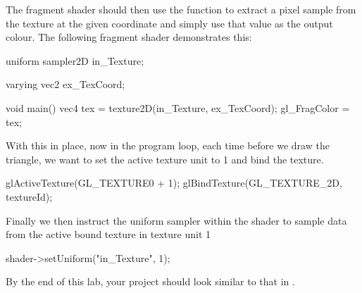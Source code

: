 \documentclass[10pt]{article}
\begin{document}
The fragment shader should then use the  function to
extract a pixel sample from the texture at the given coordinate and
simply use that value as the output colour. The following fragment shader demonstrates this:

\begin{Code}

uniform sampler2D in_Texture;

varying vec2 ex_TexCoord;

void main()
{
  vec4 tex = texture2D(in_Texture, ex_TexCoord);
  gl_FragColor = tex;
}

\end{Code}

With this in place, now in the program loop, each time before we draw the triangle,
we want to set the active texture unit to 1 and bind the texture.

\begin{Code}

glActiveTexture(GL_TEXTURE0 + 1);
glBindTexture(GL_TEXTURE_2D, textureId);

\end{Code}

Finally we then instruct the uniform sampler within the shader to sample
data from the active bound texture in texture unit 1


\begin{Code}

shader->setUniform("in_Texture", 1);

\end{Code}


By the end of this lab, your project should look similar to that in .

\end{document}
